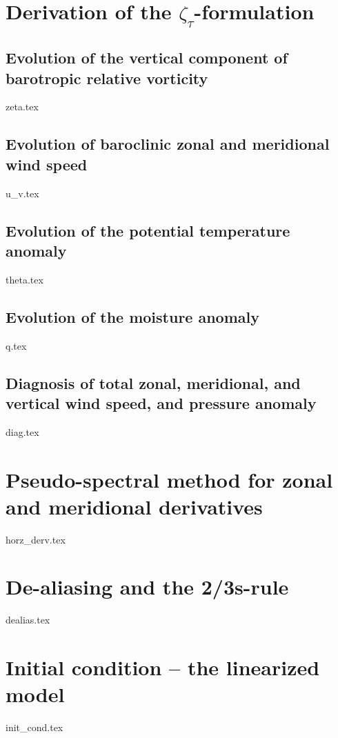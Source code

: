 \documentclass[letterpaper, 12pt]{article}
\begin{document}
\newpage
    
\clearpage
{}



\newpage

\appendix

\section{Derivation of the $\zeta_{\tau}$-formulation} \label{appendix:zeta_tau_form_deriv}

	\subsection{Evolution of the vertical component of barotropic relative vorticity} \label{subsection:zeta}
		{zeta.tex}
		
	\subsection{Evolution of baroclinic zonal and meridional wind speed} \label{subsection:u_v}
		{u_v.tex}
		
	\subsection{Evolution of the potential temperature anomaly} \label{subsection:theta}
		{theta.tex}
		
	\subsection{Evolution of the moisture anomaly} \label{subsection:q}
		{q.tex}
		
	\subsection{Diagnosis of total zonal, meridional, and vertical wind speed, and pressure anomaly} \label{subsubsection:diag}
		{diag.tex}


\section{Pseudo-spectral method for zonal and meridional derivatives} \label{appendix:horz_derv}
	{horz_derv.tex}

\section{De-aliasing and the 2/3s-rule} \label{appendix:dealias}
	{dealias.tex}

\section{Initial condition -- the linearized model} \label{appendix:linear_model}
	{init_cond.tex}
\end{document}
